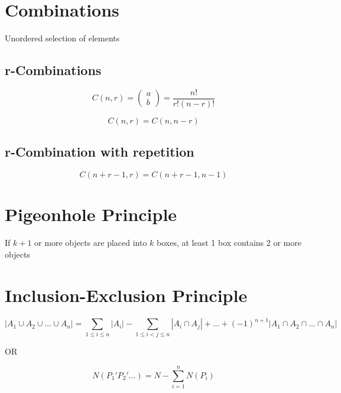 \documentclass[12pt]{article}
\begin{document}
\begin{spacing}{1.5}
\section{Combinations}

Unordered selection of elements

\subsection{r-Combinations}

$$C(n, r) = \left( \begin{array}{c} a \\ b \end{array} \right) = \frac{n!}{r!(n-r)!}$$

$$C(n,r) = C(n, n-r)$$

\subsection{r-Combination with repetition}

$$C(n+r-1, r) = C(n+r-1, n-1)$$

\section{Pigeonhole Principle}

If $k + 1$ or more objects are placed into $k$ boxes, at least 1 box contains 2 or more objects 

\section{Inclusion-Exclusion Principle}

$$|A_1 \cup A_2 \cup ... \cup A_n|  = \sum_{1 \le i \le n} |A_i| - \sum_{1 \le i < j \le n} |A_i \cap A_j| + ... + (-1)^{n+1} |A_1 \cap A_2 \cap ... \cap A_n|$$

OR

$$N(P_1' P_2' ...) = N - \sum_{i = 1}^n N(P_i)$$


\end{spacing}
\end{document}
